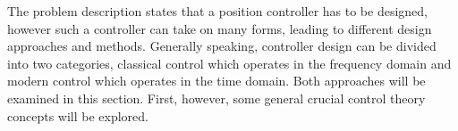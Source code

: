 \documentclass[../../main.tex]{subfiles}
\begin{document}
The problem description states that a position controller has to be designed, however such a controller can take on many forms, leading to different design approaches and methods. Generally speaking, controller design can be divided into two categories, classical control which operates in the frequency domain and modern control which operates in the time domain. Both approaches will be examined in this section. First, however, some general crucial control theory concepts will be explored.











\end{document}
